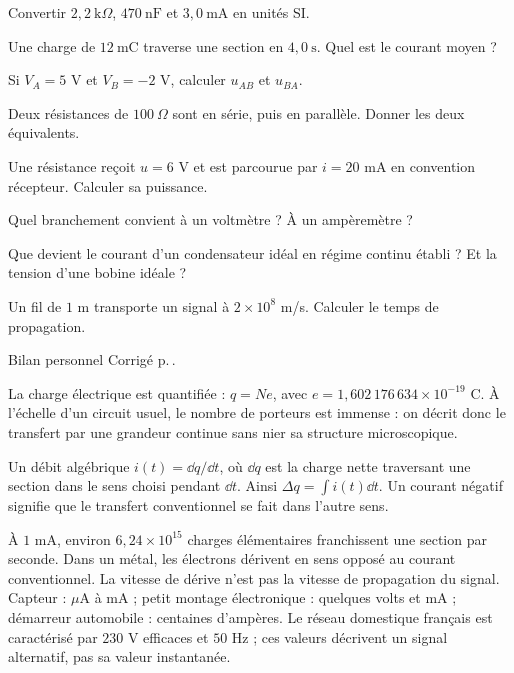\begin{questions}
\item Convertir $2{,}2\ \mathrm{k}\Omega$, $470\ \mathrm{nF}$ et $3{,}0\ \mathrm{mA}$ en unités SI.
\item Une charge de $12\ \mathrm{mC}$ traverse une section en $4{,}0\ \mathrm{s}$. Quel est le courant moyen ?
\item Si $V_A=5$ V et $V_B=-2$ V, calculer $u_{AB}$ et $u_{BA}$.
\item Deux résistances de $100\ \Omega$ sont en série, puis en parallèle. Donner les deux équivalents.
\item Une résistance reçoit $u=6$ V et est parcourue par $i=20$ mA en convention récepteur. Calculer sa puissance.
\item Quel branchement convient à un voltmètre ? À un ampèremètre ?
\item Que devient le courant d’un condensateur idéal en régime continu établi ? Et la tension d’une bobine idéale ?
\item Un fil de $1$ m transporte un signal à $2\times10^8$ m/s. Calculer le temps de propagation.
\end{questions}
\begin{docu}{Bilan personnel}
Corrigé p.\,\pageref{ch02-corr-diag}.
\end{docu}


La charge électrique est quantifiée : $q=Ne$, avec $e=1{,}602\,176\,634\times10^{-19}$ C. À l’échelle d’un circuit usuel, le nombre de porteurs est immense : on décrit donc le transfert par une grandeur continue sans nier sa structure microscopique.
\begin{loi}{Un débit algébrique}
$i(t)=\dd q/\dd t$, où $\dd q$ est la charge nette traversant une section dans le sens choisi pendant $\dd t$. Ainsi $\Delta q=\int i(t)\dd t$. Un courant négatif signifie que le transfert conventionnel se fait dans l’autre sens.
\end{loi}
À $1$ mA, environ $6{,}24\times10^{15}$ charges élémentaires franchissent une section par seconde. Dans un métal, les électrons dérivent en sens opposé au courant conventionnel. La vitesse de dérive n’est pas la vitesse de propagation du signal.
Capteur : $\mu\mathrm{ A}$ à $\mathrm{mA}$ ; petit montage électronique : quelques volts et $\mathrm{mA}$ ; démarreur automobile : centaines d’ampères. Le réseau domestique français est caractérisé par $230$ V efficaces et $50$ Hz ; ces valeurs décrivent un signal alternatif, pas sa valeur instantanée.



